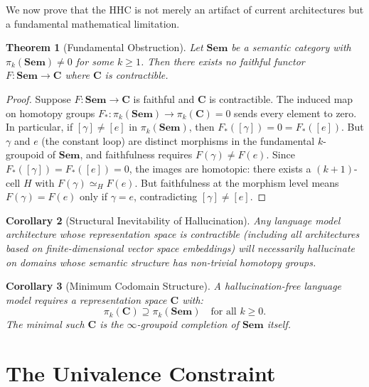 \documentclass[11pt,a4paper]{article}
\theoremstyle{plain}
\newtheorem{theorem}{Theorem}[section]
\newtheorem{corollary}[theorem]{Corollary}
\theoremstyle{definition}
\newcommand{\CC}{\mathbf{C}}
\newcommand{\Sem}{\mathbf{Sem}}
\begin{document}
We now prove that the HHC is not merely an artifact of current architectures but a fundamental mathematical limitation.

\begin{theorem}[Fundamental Obstruction]\label{thm:fundamental}
Let $\Sem$ be a semantic category with $\pi_k(\Sem) \neq 0$ for some $k \geq 1$. Then there exists no faithful functor $F\colon \Sem \to \CC$ where $\CC$ is contractible.
\end{theorem}

\begin{proof}
Suppose $F\colon \Sem \to \CC$ is faithful and $\CC$ is contractible. The induced map on homotopy groups $F_*\colon \pi_k(\Sem) \to \pi_k(\CC) = 0$ sends every element to zero. In particular, if $[\gamma] \neq [e]$ in $\pi_k(\Sem)$, then $F_*([\gamma]) = 0 = F_*([e])$. But $\gamma$ and $e$ (the constant loop) are distinct morphisms in the fundamental $k$-groupoid of $\Sem$, and faithfulness requires $F(\gamma) \neq F(e)$. Since $F_*([\gamma]) = F_*([e]) = 0$, the images are homotopic: there exists a $(k+1)$-cell $H$ with $F(\gamma) \simeq_H F(e)$. But faithfulness at the morphism level means $F(\gamma) = F(e)$ only if $\gamma = e$, contradicting $[\gamma] \neq [e]$.
\end{proof}

\begin{corollary}[Structural Inevitability of Hallucination]\label{cor:inevitable}
Any language model architecture whose representation space is contractible (including all architectures based on finite-dimensional vector space embeddings) will necessarily hallucinate on domains whose semantic structure has non-trivial homotopy groups.
\end{corollary}

\begin{corollary}[Minimum Codomain Structure]\label{cor:minimum}
A hallucination-free language model requires a representation space $\CC$ with:
\begin{equation}\label{eq:minstructure}
  \pi_k(\CC) \supseteq \pi_k(\Sem) \quad \text{for all } k \geq 0.
\end{equation}
The minimal such $\CC$ is the $\infty$-groupoid completion of $\Sem$ itself.
\end{corollary}

\section{The Univalence Constraint}\label{sec:univalence}
\end{document}
